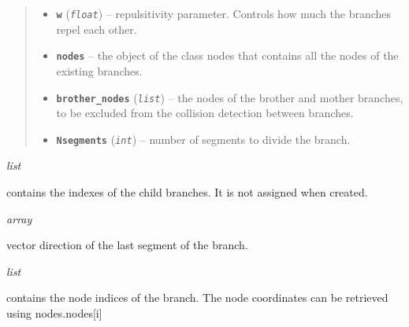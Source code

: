 \documentclass[letterpaper,10pt,english]{sphinxmanual}
\begin{document}
\begin{fulllineitems}
\begin{quote}
\begin{description}
\begin{itemize}
\item {} 
\textbf{\texttt{w}} (\emph{\texttt{float}}) -- repulsitivity parameter. Controls how much the branches repel each other.

\item {} 
\textbf{\texttt{nodes}} -- the object of the class nodes that contains all the nodes of the existing branches.

\item {} 
\textbf{\texttt{brother\_nodes}} (\emph{\texttt{list}}) -- the nodes of the brother and mother branches, to be excluded from the collision detection between branches.

\item {} 
\textbf{\texttt{Nsegments}} (\emph{\texttt{int}}) -- number of segments to divide the branch.

\end{itemize}

\end{description}\end{quote}

\begin{fulllineitems}
\label{Branch3D:Branch3D.Branch.child}
\emph{list}

contains the indexes of the child branches. It is not assigned when created.

\end{fulllineitems}


\begin{fulllineitems}
\label{Branch3D:Branch3D.Branch.dir}
\emph{array}

vector direction of the last segment of the branch.

\end{fulllineitems}


\begin{fulllineitems}
\label{Branch3D:Branch3D.Branch.nodes}
\emph{list}

contains the node indices of the branch. The node coordinates can be retrieved using nodes.nodes{[}i{]}

\end{fulllineitems}



\end{fulllineitems}
\end{document}
